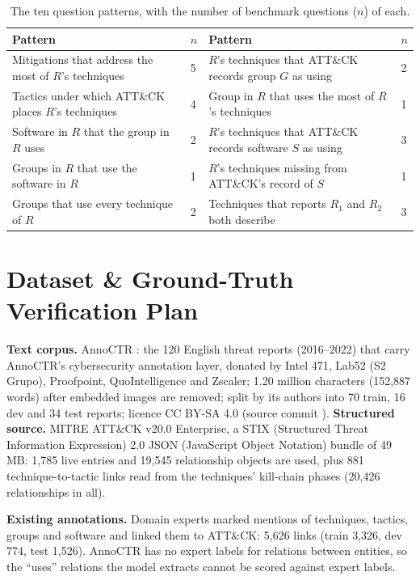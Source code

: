 \documentclass[10pt]{article}
\begin{document}
\begin{table}[H]\centering\small
\caption{The ten question patterns, with the number of benchmark questions ($n$) of each.}\label{tab:patterns}
\begin{tabularx}{\textwidth}{@{}Lp{0.35cm}Lp{0.35cm}@{}}
\toprule
Pattern & $n$ & Pattern & $n$\\
\midrule
Mitigations that address the most of $R$'s techniques & 5 & $R$'s techniques that ATT\&CK records group $G$ as using & 2\\
Tactics under which ATT\&CK places $R$'s techniques & 4 & Group in $R$ that uses the most of $R$'s techniques & 1\\
Software in $R$ that the group in $R$ uses & 2 & $R$'s techniques that ATT\&CK records software $S$ as using & 3\\
Groups in $R$ that use the software in $R$ & 1 & $R$'s techniques missing from ATT\&CK's record of $S$ & 1\\
Groups that use every technique of $R$ & 2 & Techniques that reports $R_1$ and $R_2$ both describe & 3\\
\bottomrule
\end{tabularx}
\end{table}

\section{Dataset \& Ground-Truth Verification Plan}\label{sec:data}
\textbf{Text corpus.} AnnoCTR \cite{1}: the 120 English threat reports (2016--2022) that carry AnnoCTR's cybersecurity annotation layer, donated by Intel 471, Lab52 (S2 Grupo), Proofpoint, QuoIntelligence and Zscaler; 1.20 million characters (152,887 words) after embedded images are removed; split by its authors into 70 train, 16 dev and 34 test reports; licence CC BY-SA 4.0 (source commit ). \textbf{Structured source.} MITRE ATT\&CK v20.0 Enterprise, a STIX (Structured Threat Information Expression) 2.0 JSON (JavaScript Object Notation) bundle of 49\,MB: 1,785 live entries and 19,545 relationship objects are used, plus 881 technique-to-tactic links read from the techniques' kill-chain phases (20,426 relationships in all).

\textbf{Existing annotations.} Domain experts marked mentions of techniques, tactics, groups and software and linked them to ATT\&CK: 5,626 links (train 3,326, dev 774, test 1,526). AnnoCTR has no expert labels for relations between entities, so the ``uses'' relations the model extracts cannot be scored against expert labels.
\end{document}

